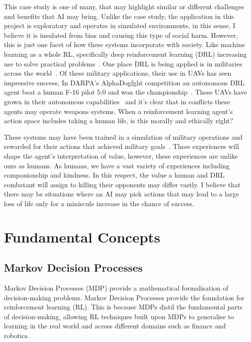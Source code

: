 \documentclass[]{final_report}
\begin{document}
This case study is one of many, that may highlight similar or different challenges and benefits that AI may bring. Unlike the case study, the application in this project is exploratory and operates in simulated environments, in this sense, I believe it is insulated from bias and causing this type of social harm. However, this is just one facet of how these systems incorporate with society. Like machine learning as a whole RL, specifically deep reinforcement learning (DRL) increasing use to solve practical problems~\cite{deepRLsocietalImpact}. One place DRL is being applied is in militaries across the world~\cite{rlMilitaryReviewChina, DRLDrones}. Of these military applications, their use in UAVs has seen impressive success, In DARPA's AlphaDogfght competition an autonomous DRL agent beat a human F-16 pilot 5:0 and won the championship~\cite{rlMilitaryReviewChina}. These UAVs have grown in their autonomous capabilities~\cite{DRLDrones} and it's clear that in conflicts these agents may operate weapons systems. When a reinforcement learning agent's action space includes taking a human life, is this morally and ethically right?

These systems may have been trained in a simulation of military operations and rewarded for their actions that achieved military goals~\cite{rlMilitaryReviewChina}. These experiences will shape the agent's interpretation of value, however, these experiences are unlike ours as humans. As humans, we have a vast variety of experiences including companionship and kindness. In this respect, the value a human and DRL combatant will assign to killing their opponents may differ vastly. I believe that there may be situations where an AI may pick actions that may lead to a large loss of life only for a miniscule increase in the chance of success. 

\chapter{Fundamental Concepts}
\section{Markov Decision Processes}

Markov Decision Processes (MDP) provide a mathematical formalisation of decision-making problems. Markov Decision Processes provide the foundation for reinforcement learning (RL). This is because MDPs distil the fundamental parts of decision-making, allowing RL techniques built upon MDPs to generalise to learning in the real world and across different domains such as finance and robotics. 
\end{document}

